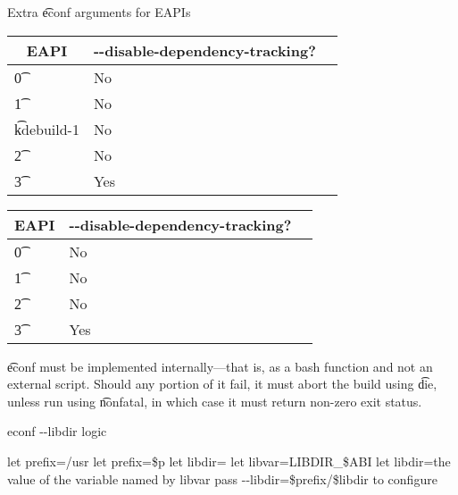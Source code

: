 \begin{description}
    \begin{centertable}{Extra \t{econf} arguments for EAPIs} \label{tab:econf-options-table}
    \IFKDEBUILDELSE
    {
        \begin{tabular}{ l l l }
            \toprule
                \multicolumn{1}{c}{\textbf{EAPI}} &
                \multicolumn{1}{c}{\textbf{-{}-disable-dependency-tracking}?} \\
                \midrule
        \t{0} & No \\
        \t{1} & No \\
        \t{kdebuild-1} & No \\
        \t{2} & No \\
        \t{3} & Yes \\
        \bottomrule
        \end{tabular}
    }{
        \begin{tabular}{ l l l }
            \toprule
                \multicolumn{1}{c}{\textbf{EAPI}} &
                \multicolumn{1}{c}{\textbf{-{}-disable-dependency-tracking}?} \\
                \midrule
        \t{0} & No \\
        \t{1} & No \\
        \t{2} & No \\
        \t{3} & Yes \\
        \bottomrule
        \end{tabular}
    }
    \end{centertable}

    \t{econf} must be implemented internally---that is, as a bash function and not an external
    script. Should any portion of it fail, it must abort the build using \t{die}, unless run using
    \t{nonfatal}, in which case it must return non-zero exit status.

\begin{algorithm}
\caption{econf -{}-libdir logic} \label{alg:econf-libdir}
\begin{algorithmic}[1]
\STATE let prefix=/usr
    \STATE let prefix=\$p
\ENDIF
\STATE let libdir=
    \STATE let libvar=LIBDIR\_\$ABI
        \STATE let libdir=the value of the variable named by libvar
    \ENDIF
\ENDIF
{}
    \STATE pass -{}-libdir=\$prefix/\$libdir to configure
\ENDIF
\end{algorithmic}
\end{algorithm}


\end{description}
